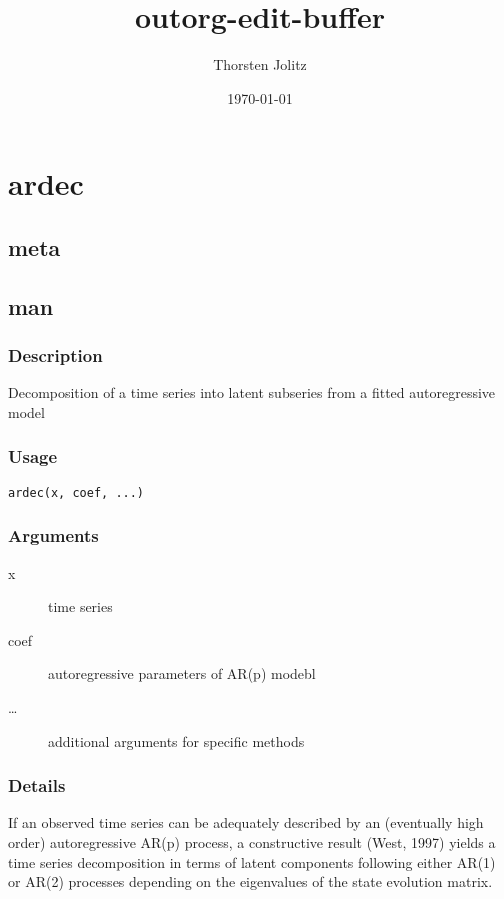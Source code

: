 \documentclass[11pt]{article}
\author{Thorsten Jolitz}
\date{\today}
\title{\textbf{outorg-edit-buffer}}
\begin{document}
\maketitle
\tableofcontents

\section{ardec}
\label{sec-1}
\subsection{meta}
\label{sec-1-1}
\subsection{man}
\label{sec-1-2}
\subsubsection{Description}
\label{sec-1-2-1}

Decomposition of a time series into latent subseries from a fitted
autoregressive model
\subsubsection{Usage}
\label{sec-1-2-2}

\begin{verbatim}
ardec(x, coef, ...)
\end{verbatim}
\subsubsection{Arguments}
\label{sec-1-2-3}

\begin{description}
\item[x] time series
\item[coef] autoregressive parameters of AR(p) modebl
\item[\ldots{}] additional arguments for specific methods
\end{description}
\subsubsection{Details}
\label{sec-1-2-4}

If an observed time series can be adequately described by an (eventually high
order) autoregressive AR(p) process, a constructive result (West, 1997) yields
a time series decomposition in terms of latent components following either
AR(1) or AR(2) processes depending on the eigenvalues of the state evolution
matrix.
\end{document}
